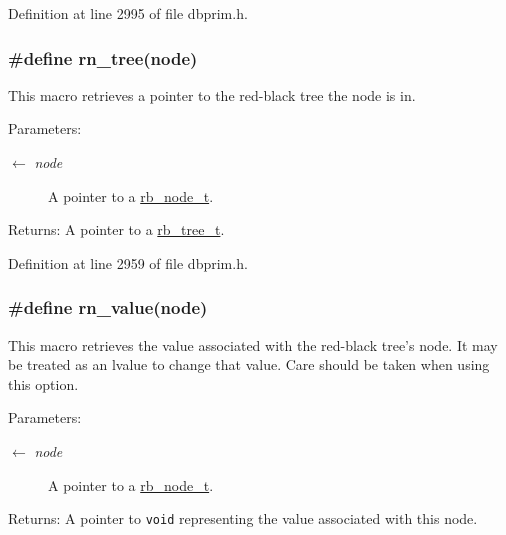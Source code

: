 Definition at line 2995 of file dbprim.h.\hypertarget{group__dbprim__rbtree_ga34}{
\subsubsection[rn\_\-tree]{\setlength{\rightskip}{0pt plus 5cm}\#define rn\_\-tree(node)}}
\label{group__dbprim__rbtree_ga34}


This macro retrieves a pointer to the red-black tree the node is in.

\begin{Desc}
\item[Parameters:]
\begin{description}
\item[\mbox{$\leftarrow$} {\em node}]A pointer to a \hyperlink{group__dbprim__rbtree_ga1}{rb\_\-node\_\-t}.\end{description}
\end{Desc}
\begin{Desc}
\item[Returns:]A pointer to a \hyperlink{group__dbprim__rbtree_ga0}{rb\_\-tree\_\-t}.\end{Desc}


Definition at line 2959 of file dbprim.h.\hypertarget{group__dbprim__rbtree_ga39}{
\subsubsection[rn\_\-value]{\setlength{\rightskip}{0pt plus 5cm}\#define rn\_\-value(node)}}
\label{group__dbprim__rbtree_ga39}


This macro retrieves the value associated with the red-black tree's node. It may be treated as an lvalue to change that value. Care should be taken when using this option.

\begin{Desc}
\item[Parameters:]
\begin{description}
\item[\mbox{$\leftarrow$} {\em node}]A pointer to a \hyperlink{group__dbprim__rbtree_ga1}{rb\_\-node\_\-t}.\end{description}
\end{Desc}
\begin{Desc}
\item[Returns:]A pointer to {\tt void} representing the value associated with this node.\end{Desc}


